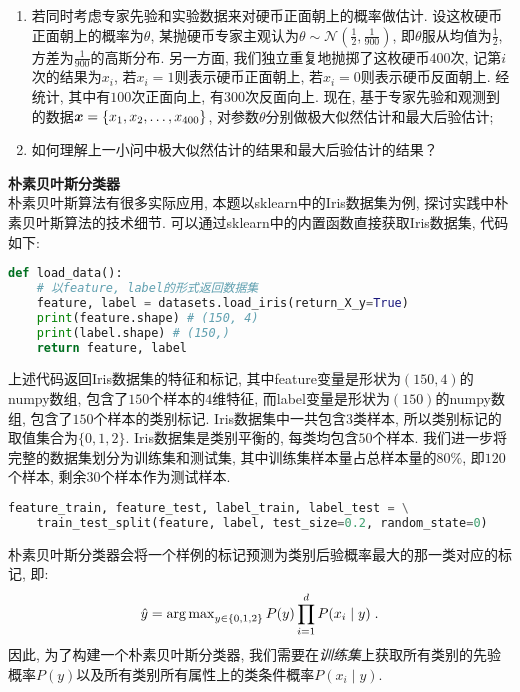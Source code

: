 \documentclass[answers]{exam}  %
\begin{document}
\begin{questions}
\begin{enumerate}
	\item 若同时考虑专家先验和实验数据来对硬币正面朝上的概率做估计. 设这枚硬币正面朝上的概率为$\theta$, 某抛硬币专家主观认为$\theta\sim\mathcal{N}(\frac{1}{2}, \frac{1}{900})$, 即$\theta$服从均值为$\frac{1}{2}$, 方差为$\frac{1}{900}$的高斯分布. 另一方面, 我们独立重复地抛掷了这枚硬币$400$次, 记第$i$次的结果为$x_i$, 若$x_i=1$则表示硬币正面朝上, 若$x_i=0$则表示硬币反面朝上. 经统计, 其中有$100$次正面向上, 有$300$次反面向上. 现在, 基于专家先验和观测到的数据${\boldsymbol{x}}=\{x_1, x_2, \ldots, x_{400}\}$, 对参数$\theta$分别做极大似然估计和最大后验估计;
    
    \item 如何理解上一小问中极大似然估计的结果和最大后验估计的结果？
\end{enumerate}

\begin{solution}
\end{solution}


\question [20] \textbf{朴素贝叶斯分类器} \\
朴素贝叶斯算法有很多实际应用, 本题以sklearn中的Iris数据集为例, 探讨实践中朴素贝叶斯算法的技术细节. 可以通过sklearn中的内置函数直接获取Iris数据集, 代码如下:
\begin{lstlisting}[language=Python]
def load_data():
    # 以feature, label的形式返回数据集
    feature, label = datasets.load_iris(return_X_y=True)
    print(feature.shape) # (150, 4)
    print(label.shape) # (150,)
    return feature, label
\end{lstlisting}
上述代码返回Iris数据集的特征和标记, 其中feature变量是形状为$(150, 4)$的numpy数组, 包含了$150$个样本的$4$维特征, 而label变量是形状为$(150)$的numpy数组, 包含了$150$个样本的类别标记. Iris数据集中一共包含$3$类样本, 所以类别标记的取值集合为$\{0,1,2\}$. Iris数据集是类别平衡的, 每类均包含$50$个样本. 我们进一步将完整的数据集划分为训练集和测试集, 其中训练集样本量占总样本量的$80\%$, 即$120$个样本, 剩余$30$个样本作为测试样本.
\begin{lstlisting}[language=Python]
feature_train, feature_test, label_train, label_test = \
    train_test_split(feature, label, test_size=0.2, random_state=0)
\end{lstlisting}
朴素贝叶斯分类器会将一个样例的标记预测为类别后验概率最大的那一类对应的标记, 即:
\begin{equation}
\hat{y}=\operatorname{arg\,max}_{y\in\{0,1,2\}}P(y)\prod_{i=1}^{d}P(x_i\mid y)\;.
\end{equation}
因此, 为了构建一个朴素贝叶斯分类器, 我们需要在{\em 训练集}上获取所有类别的先验概率$P(y)$以及所有类别所有属性上的类条件概率$P(x_i\mid y)$.


\end{questions}
\end{document}
